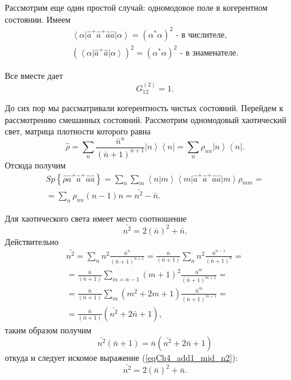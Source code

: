 Рассмотрим еще один простой случай: одномодовое поле в когерентном состоянии. Имеем
\begin{eqnarray}
\left<\alpha\right|\hat{a}^{+}\hat{a}^{+}\hat{a}\hat{a}\left|\alpha\right>
= \left(\alpha^{*}\alpha\right)^2
\mbox{ - в числителе},
\nonumber \\
\left(\left<\alpha\right|\hat{a}^{+}\hat{a}\left|\alpha\right>\right)^2
= \left(\alpha^{*}\alpha\right)^2
\mbox{ - в знаменателе}.
\nonumber
\end{eqnarray}

Все вместе дает
\[
G^{(2)}_{12} = 1.
\]

До сих пор мы рассматривали когерентность чистых состояний. Перейдем к
рассмотрению смешанных состояний. Рассмотрим одномодовый хаотический
свет, матрица плотности которого равна 
\[
\hat{\rho} = \sum_{n}\frac{\bar{n}^n}{\left(\bar{n} + 1\right)^{n +
    1}} \left|n\right>\left<n\right| = 
\sum_n\rho_{nn}\left|n\right>\left<n\right|.
\]
Отсюда получим
\begin{eqnarray}
Sp \left\{\hat{\rho}\hat{a}^{+}\hat{a}^{+}\hat{a}\hat{a}\right\} = 
\sum_{n}\sum_{m}\left<n\right|\left.m\right>\left<m\right|
\hat{a}^{+}\hat{a}^{+}\hat{a}\hat{a}
\left|m\right> \rho_{mm} = 
\nonumber \\
= \sum_{n}\rho_{nn}\left(n - 1\right)n = \bar{n^2} - \bar{n}.
\label{eqCh4_add1_sp}
\end{eqnarray}

Для хаотического света имеет место соотношение
\begin{equation}
\bar{n^2} = 2
\left(\bar{n}\right)^2 + \bar{n}.
\label{eqCh4_add1_mid_n2}
\end{equation}
Действительно
\begin{eqnarray}
\bar{n^2} = 
\sum_n n^2 \frac{\bar{n}^n}{\left(\bar{n} + 1\right)^{n + 1}} = 
\frac{\bar{n}}{\left(\bar{n} + 1\right)}\sum_n n^2
\frac{\bar{n}^{n-1}}{\left(\bar{n} + 1\right)^{n}} =
\nonumber \\
= 
\frac{\bar{n}}{\left(\bar{n} + 1\right)}\sum_{m = n -1} \left(m +
1\right)^2
\frac{\bar{n}^m}{\left(\bar{n} + 1\right)^{m + 1}} = 
\nonumber \\
= \frac{\bar{n}}{\left(\bar{n} + 1\right)}\sum_m
\left(m^2 + 2 m + 1\right)
\frac{\bar{n}^m}{\left(\bar{n} + 1\right)^{m + 1}} = 
\nonumber \\
=
\frac{\bar{n}}{\left(\bar{n} + 1\right)}\left(\bar{n^2} + 2 \bar{n} +
1\right),
\nonumber
\end{eqnarray}
таким образом получим
\begin{equation}
\bar{n^2}\left(\bar{n} + 1\right) = 
\bar{n}\left(\bar{n^2} + 2 \bar{n} + 1\right)
\nonumber
\end{equation}
откуда и следует искомое выражение (\ref{eqCh4_add1_mid_n2}):
\begin{equation}
\bar{n^2} = 2
\left(\bar{n}\right)^2 + \bar{n}.
\nonumber
\end{equation}

